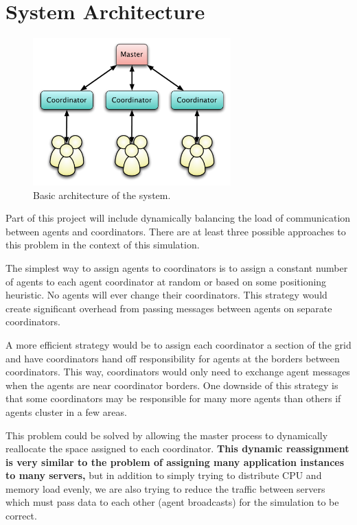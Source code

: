 \section{System Architecture}

\begin{figure}[h!]
    \begin{center}
        \includegraphics[width=3in]{figures/arch0.pdf}
    \end{center}
    \caption{Basic architecture of the system.}
    \label{mvt}
\end{figure}

Part of this project will include dynamically balancing the load of communication between agents and
coordinators. There are at least three possible approaches to this problem in the context of this
simulation.

The simplest way to assign agents to coordinators is to assign a constant number of agents to each
agent coordinator at random or based on some positioning heuristic. No agents will ever change their
coordinators. This strategy would create significant overhead from passing messages between agents
on separate coordinators.

A more efficient strategy would be to assign each coordinator a section of the grid and have
coordinators hand off responsibility for agents at the borders between coordinators. This way,
coordinators would only need to exchange agent messages when the agents are near coordinator
borders. One downside of this strategy is that some coordinators may be responsible for many more
agents than others if agents cluster in a few areas.

This problem could be solved by allowing the master process to dynamically reallocate the space
assigned to each coordinator. \textbf{This dynamic reassignment is very similar to the problem of
assigning many application instances to many servers,} but in addition to simply trying to
distribute CPU and memory load evenly, we are also trying to reduce the traffic between servers
which must pass data to each other (agent broadcasts) for the simulation to be correct.
